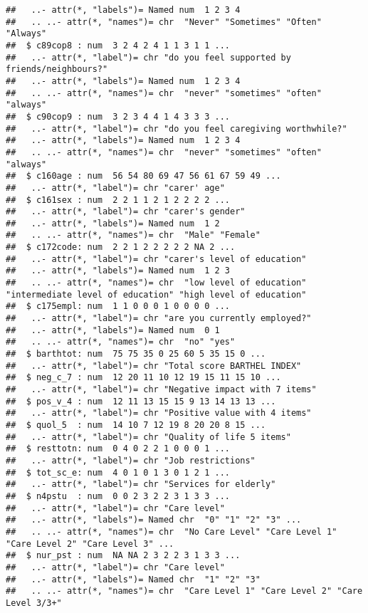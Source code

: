 \documentclass[]{article}
\newenvironment{Shaded}{\begin{snugshade}}{\end{snugshade}}
\newcommand{\KeywordTok}[1]{\textcolor[rgb]{0.13,0.29,0.53}{\textbf{#1}}}
\newcommand{\OperatorTok}[1]{\textcolor[rgb]{0.81,0.36,0.00}{\textbf{#1}}}
\newcommand{\NormalTok}[1]{#1}
\begin{document}
\begin{verbatim}
##   ..- attr(*, "labels")= Named num  1 2 3 4
##   .. ..- attr(*, "names")= chr  "Never" "Sometimes" "Often" "Always"
##  $ c89cop8 : num  3 2 4 2 4 1 1 3 1 1 ...
##   ..- attr(*, "label")= chr "do you feel supported by friends/neighbours?"
##   ..- attr(*, "labels")= Named num  1 2 3 4
##   .. ..- attr(*, "names")= chr  "never" "sometimes" "often" "always"
##  $ c90cop9 : num  3 2 3 4 4 1 4 3 3 3 ...
##   ..- attr(*, "label")= chr "do you feel caregiving worthwhile?"
##   ..- attr(*, "labels")= Named num  1 2 3 4
##   .. ..- attr(*, "names")= chr  "never" "sometimes" "often" "always"
##  $ c160age : num  56 54 80 69 47 56 61 67 59 49 ...
##   ..- attr(*, "label")= chr "carer' age"
##  $ c161sex : num  2 2 1 1 2 1 2 2 2 2 ...
##   ..- attr(*, "label")= chr "carer's gender"
##   ..- attr(*, "labels")= Named num  1 2
##   .. ..- attr(*, "names")= chr  "Male" "Female"
##  $ c172code: num  2 2 1 2 2 2 2 2 NA 2 ...
##   ..- attr(*, "label")= chr "carer's level of education"
##   ..- attr(*, "labels")= Named num  1 2 3
##   .. ..- attr(*, "names")= chr  "low level of education" "intermediate level of education" "high level of education"
##  $ c175empl: num  1 1 0 0 0 1 0 0 0 0 ...
##   ..- attr(*, "label")= chr "are you currently employed?"
##   ..- attr(*, "labels")= Named num  0 1
##   .. ..- attr(*, "names")= chr  "no" "yes"
##  $ barthtot: num  75 75 35 0 25 60 5 35 15 0 ...
##   ..- attr(*, "label")= chr "Total score BARTHEL INDEX"
##  $ neg_c_7 : num  12 20 11 10 12 19 15 11 15 10 ...
##   ..- attr(*, "label")= chr "Negative impact with 7 items"
##  $ pos_v_4 : num  12 11 13 15 15 9 13 14 13 13 ...
##   ..- attr(*, "label")= chr "Positive value with 4 items"
##  $ quol_5  : num  14 10 7 12 19 8 20 20 8 15 ...
##   ..- attr(*, "label")= chr "Quality of life 5 items"
##  $ resttotn: num  0 4 0 2 2 1 0 0 0 1 ...
##   ..- attr(*, "label")= chr "Job restrictions"
##  $ tot_sc_e: num  4 0 1 0 1 3 0 1 2 1 ...
##   ..- attr(*, "label")= chr "Services for elderly"
##  $ n4pstu  : num  0 0 2 3 2 2 3 1 3 3 ...
##   ..- attr(*, "label")= chr "Care level"
##   ..- attr(*, "labels")= Named chr  "0" "1" "2" "3" ...
##   .. ..- attr(*, "names")= chr  "No Care Level" "Care Level 1" "Care Level 2" "Care Level 3" ...
##  $ nur_pst : num  NA NA 2 3 2 2 3 1 3 3 ...
##   ..- attr(*, "label")= chr "Care level"
##   ..- attr(*, "labels")= Named chr  "1" "2" "3"
##   .. ..- attr(*, "names")= chr  "Care Level 1" "Care Level 2" "Care Level 3/3+"
\end{verbatim}

\begin{Shaded}
\end{Shaded}
\end{document}
